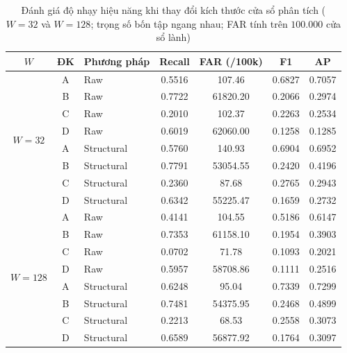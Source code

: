 \documentclass[12pt, a4paper, reqno, oneside]{book}
\begin{document}
{\renewcommand{\arraystretch}{0.85}
\begin{table}[htbp]
\centering\footnotesize\setlength{\tabcolsep}{5pt}
\caption[Độ nhạy hiệu năng theo kích thước cửa sổ $W=32$ và $W=128$]{Đánh giá độ nhạy hiệu năng khi thay đổi kích thước cửa sổ phân tích ($W=32$ và $W=128$; trọng số bốn tập ngang nhau; FAR tính trên $100.000$ cửa sổ lành)}\label{tab:extension-w32}
\vspace{2pt}
\begin{tabular}{cclcccc}
\toprule
$W$ & ĐK & Phương pháp & Recall & FAR (/100k) & F1 & AP\\\midrule
\multirow{8}{*}{$W=32$} 
 & A & Raw & 0.5516 & 107.46 & 0.6827 & 0.7057\\
 & B & Raw & 0.7722 & 61820.20 & 0.2066 & 0.2974\\
 & C & Raw & 0.2010 & 102.37 & 0.2263 & 0.2534\\
 & D & Raw & 0.6019 & 62060.00 & 0.1258 & 0.1285\\
 & A & Structural & 0.5760 & 140.93 & 0.6904 & 0.6952\\
 & B & Structural & 0.7791 & 53054.55 & 0.2420 & 0.4196\\
 & C & Structural & 0.2360 & 87.68 & 0.2765 & 0.2943\\
 & D & Structural & 0.6342 & 55225.47 & 0.1659 & 0.2732\\\midrule
\multirow{8}{*}{$W=128$} 
 & A & Raw & 0.4141 & 104.55 & 0.5186 & 0.6147\\
 & B & Raw & 0.7353 & 61158.10 & 0.1954 & 0.3903\\
 & C & Raw & 0.0702 & 71.78 & 0.1093 & 0.2021\\
 & D & Raw & 0.5957 & 58708.86 & 0.1111 & 0.2516\\
 & A & Structural & 0.6248 & 95.04 & 0.7339 & 0.7299\\
 & B & Structural & 0.7481 & 54375.95 & 0.2468 & 0.4899\\
 & C & Structural & 0.2213 & 68.53 & 0.2558 & 0.3073\\
 & D & Structural & 0.6589 & 56877.92 & 0.1764 & 0.3097\\
\bottomrule
\end{tabular}
\end{table}}
\end{document}
